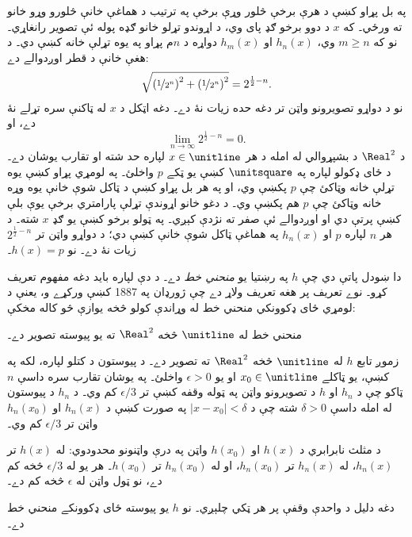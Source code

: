 \documentclass[../../../include/open-logic-section]{subfiles}
\begin{document}
په بل پړاو کښې د هرې برخې څلور وړې برخې په ترتيب د هماغې خانې څلورو وړو خانو ته ورځي۔ که $x$ د دوو برخو ګډ پای وي، د اړوندو تړلو خانو ګډه پوله ئې تصوير رانغاړي۔ نو که $m\ge n$ وي، $h_n(x)$ او $h_m(x)$ دواړه د $n$م پړاو په يوه تړلې خانه کښې دي۔ د هغې خانې د قطر اوږدوالے دے:
\[
\sqrt{\left(\nicefrac{1}{2^n}\right)^2+\left(\nicefrac{1}{2^n}\right)^2}=2^{\frac{1}{2}-n}.
\]
نو د دواړو تصويرونو واټن تر دغه حده زيات نۀ دے۔ دغه اټکل د $x$ له ټاکنې سره تړلے نۀ دے، او
\[
\lim_{n\rightarrow\infty}2^{\frac{1}{2}-n}=0.
\]
د $\Real^2$ د بشپړوالي له امله د هر $x\in\unitline$ لپاره حد شته او تقارب يوشان دے۔
د ځای ډکولو لپاره په $\unitsquare$ کښې يو ټکے $p$ واخلئ۔ په لومړي پړاو کښې يوه تړلې خانه وټاکئ چې $p$ پکښې وي، او په هر بل پړاو کښې د ټاکل شوې خانې يوه وړه خانه وټاکئ چې $p$ هم پکښې وي۔ د دغو خانو اړوندې تړلې پارامتري برخې يوې بلې کښې پرتې دي او اوږدوالے ئې صفر ته نژدې کېږي۔ په ټولو برخو کښې يو ګډ $x$ شته۔ د هر $n$ لپاره $p$ او $h_n(x)$ په هماغې ټاکل شوې خانې کښې دي؛ د دواړو واټن تر $2^{\frac{1}{2}-n}$ زيات نۀ دے۔ نو $h(x)=p$۔

دا ښودل پاتې دي چې $h$ په رښتيا يو \emph{منحني خط} دے۔ د دې لپاره بايد دغه مفهوم تعريف کړو۔ نوے تعريف پر هغه تعريف ولاړ دے چې ژورډان په 1887 کښې ورکړے و، يعنې د لومړي ځای ډکوونکي منحني خط له وړاندې کولو څخه يوازې څو کاله مخکې:

\begin{defn}
منحني خط له $\unitline$ څخه $\Real^2$ ته يو پيوسته تصوير دے۔
\end{defn}

زموږ تابع $h$ له $\unitline$ څخه $\Real^2$ ته تصوير دے۔ د پيوستون د کتلو لپاره، لکه په  کښې، يو ټاکلے $x_0\in\unitline$ او يو $\epsilon>0$ واخلئ۔ په يوشان تقارب سره داسې $n$ ټاکو چې د $h_n$ او $h$ د تصويرونو واټن په ټوله وقفه کښې تر $\epsilon/3$ کم وي۔ د $h_n$ د پيوستون له امله داسې $\delta>0$ شته چې د $|x-x_0|<\delta$ په صورت کښې د $h_n(x)$ او $h_n(x_0)$ واټن تر $\epsilon/3$ کم وي۔

د مثلث نابرابري د $h(x)$ او $h(x_0)$ واټن په درې واټنونو محدودوي: له $h(x)$ تر $h_n(x)$، له $h_n(x)$ تر $h_n(x_0)$، او له $h_n(x_0)$ تر $h(x_0)$۔ هر يو له $\epsilon/3$ څخه کم دے، نو ټول واټن له $\epsilon$ څخه کم دے۔

دغه دليل د واحدې وقفې پر هر ټکي چلېږي۔ نو $h$ يو پيوسته ځای ډکوونکے منحني خط دے۔
\end{document}
